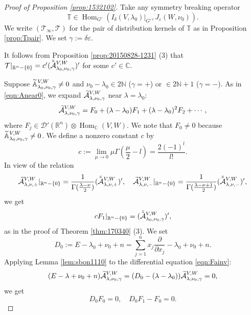 \begin{proof}
[Proof of Proposition \ref{prop:1532102}]
Take any symmetry breaking operator
\[
 {\mathbb{T}} \in {\operatorname{Hom}}_{G'}(I_{\delta}(V,\lambda_0)|_{G'}, 
 J_{\varepsilon}(W,\nu_0)).  
\]
We write $({\mathcal{T}}_{\infty}, {\mathcal{T}})$
 for the pair of distribution kernels of ${\mathbb{T}}$
 as in Proposition \ref{prop:Tpair}.  
We set $\gamma:= \delta \varepsilon$.  


It follows from Proposition \ref{prop:20150828-1231} (3)
 that 
$
   {\mathcal{T}}|_{{\mathbb{R}}^n- \{0\}}
   =
   c' (\tilde{\tilde{{\mathcal{A}}}}_{{\lambda_0},{\nu_0},{\gamma}}^{{V,W}})'$
 for some $c' \in {\mathbb{C}}$.  

Suppose ${\widetilde{\mathbb{A}}}_{{\lambda_0},{\nu_0},{\gamma}}^{{V,W}} \ne 0$
 and $\nu_0 - \lambda_0 \in 2 {\mathbb{N}}$
 ($\gamma=+$)
 or $\in 2 {\mathbb{N}}+1$
 ($\gamma=-$).  
As in \eqref{eqn:Anear0}, 
 we expand $\widetilde{{\mathcal{A}}}_{{\lambda},{\nu_0},{\gamma}}^{{V,W}}$
 near $\lambda = \lambda_0$:
\[
  \widetilde{{\mathcal{A}}}_{{\lambda},{\nu_0},{\gamma}}^{{V,W}}
  =
  F_0 + (\lambda-\lambda_0) F_1 + (\lambda-\lambda_0)^2 F_2
  + \cdots,
\]
where $F_j \in {\mathcal{D}}'({\mathbb{R}}^n) \otimes {\operatorname{Hom}}_{\mathbb{C}}(V,W)$.  
We note that $F_0 \ne 0$
 because ${\widetilde{\mathbb{A}}}_{{\lambda_0},{\nu_0},{\gamma}}^{{V,W}} \ne 0$.  
We define a nonzero constant $c$
 by 
\begin{equation}
\label{eqn:1702110}
  c:= \lim_{\mu \to 0}
      \mu \Gamma(\frac \mu 2-l)
    = \frac{2(-1)^l}{l!}.  
\end{equation}
In view of the relation
\[
   \widetilde{{\mathcal{A}}}_{{\lambda},{\nu},{+}}^{{V,W}}|_{{\mathbb{R}}^n - \{0\}}
   =
   \frac{1}{\Gamma(\frac{\lambda-\nu}{2})} (\tilde{\tilde{{\mathcal{A}}}}_{{\lambda},{\nu},{+}}^{{V,W}})', 
\quad
  \widetilde{{\mathcal{A}}}_{{\lambda},{\nu},{-}}^{{V,W}}|_{{\mathbb{R}}^n - \{0\}}
   =
   \frac{1}{\Gamma(\frac{\lambda-\nu+1}{2})} (\tilde{\tilde{{\mathcal{A}}}}_{{\lambda},{\nu},{-}}^{{V,W}})',
\]
 we get
\[
  c F_1|_{{\mathbb{R}}^n - \{0\}}
  =
  (\tilde{\tilde{{\mathcal{A}}}}_{{\lambda_0},{\nu_0},{\gamma}}^{{V,W}})', 
\]
as in the proof of Theorem \ref{thm:170340} (3).  
We set 
\[
   D_0 := E-\lambda_0 + \nu_0 + n
       = \sum_{j=1}^n x_j \frac{\partial}{\partial x_j}
         -\lambda_0 + \nu_0 + n.  
\]
Applying Lemma \ref{lem:sbon1110}
 to the differential equation \eqref{eqn:Fainv}:
\[
  (E-\lambda + \nu_0 + n) \widetilde{{\mathcal{A}}}_{{\lambda},{\nu_0},{\gamma}}^{{V,W}}
  =
  (D_0-(\lambda-\lambda_0))\widetilde{{\mathcal{A}}}_{{\lambda},{\nu_0},{\gamma}}^{{V,W}}
  =0, 
\]
we get 
\begin{equation}
\label{eqn:DF01}
D_0 F_0 =0, 
\quad
D_0 F_1 - F_0 =0. 
\end{equation}




\end{proof}
